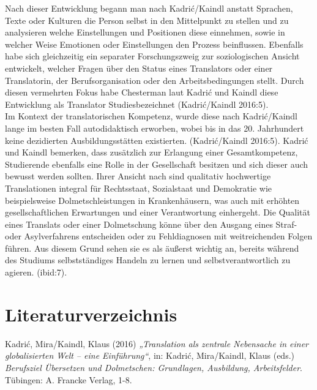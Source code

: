 \documentclass{article}
\begin{document}
	Nach dieser Entwicklung begann man nach Kadrić/Kaindl anstatt Sprachen, Texte oder Kulturen die Person selbst in den Mittelpunkt zu stellen und zu analysieren welche Einstellungen und Positionen diese einnehmen, sowie in welcher Weise Emotionen oder Einstellungen den Prozess beinflussen. Ebenfalls habe sich gleichzeitig ein separater Forschungszweig zur soziologischen Ansicht entwickelt, welcher Fragen über den Status eines Translators oder einer Translatorin, der Berufsorganisation oder den Arbeitsbedingungen stellt. Durch diesen vermehrten Fokus habe Chesterman laut Kadrić und Kaindl diese Entwicklung als \glqq Translator Studies\grqq \:bezeichnet (Kadrić/Kaindl 2016:5). \\

	Im Kontext der translatorischen Kompetenz, wurde diese nach Kadrić/Kaindl lange im besten Fall autodidaktisch erworben, wobei bis in das 20. Jahrhundert keine dezidierten Ausbildungsstätten existierten. (Kadrić/Kaindl 2016:5). Kadrić und Kaindl bemerken, dass zusätzlich zur Erlangung einer Gesamtkompetenz, Studierende ebenfalls eine Rolle in der Gesellschaft besitzen und sich dieser auch bewusst werden sollten. Ihrer Ansicht nach sind qualitativ hochwertige Translationen integral für Rechtsstaat, Sozialstaat und Demokratie wie beispielsweise Dolmetschleistungen in Krankenhäusern, was auch mit erhöhten gesellschaftlichen Erwartungen und einer Verantwortung einhergeht. Die Qualität eines Translats oder einer Dolmetschung könne über den Ausgang eines Straf- oder Asylverfahrens entscheiden oder zu Fehldiagnosen mit weitreichenden Folgen führen. Aus diesem Grund sehen sie es als äußerst wichtig an, bereits während des Studiums selbstständiges Handeln zu lernen und selbstverantwortlich zu agieren. (ibid:7).

	\newpage
	\section*{Literaturverzeichnis}
	Kadrić, Mira/Kaindl, Klaus (2016) \textit{„Translation als zentrale Nebensache in einer globalisierten Welt – eine Einführung“}, in: Kadrić, Mira/Kaindl, Klaus (eds.) \textit{Berufsziel Übersetzen und Dolmetschen: Grundlagen, Ausbildung, Arbeitsfelder}. Tübingen: A. Francke Verlag, 1-8. 
\end{document}
